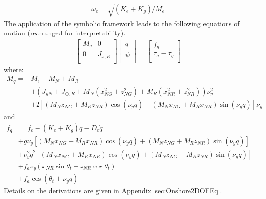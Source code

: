 \documentclass[wes, manuscript]{copernicus}
\begin{document}
\begin{align}
    \omega_e = \sqrt{(K_e+K_g)/M_e}
\end{align}
The application of the symbolic framework leads to the following equations of motion (rearranged for interpretability):
\begin{align}
    \begin{bmatrix}
    M_q & 0 \\ 
    0 & J_{x,R} \\ 
    \end{bmatrix}
    \begin{bmatrix}
    \ddot{q}\\
    \ddot{\psi}\\
    \end{bmatrix}
    =
    \begin{bmatrix}
    f_q \\
    \tau_a-\tau_g\\
    \end{bmatrix}
    \label{eq:EOM2DOF}
\end{align}
where:
\begin{align}
M_q = & M_{e} +  M_N + M_R \label{eq:Mq1}\\
     &+ (J_{y N} + J_{\oplus,R} + M_N(x_{NG}^{2} + z_{NG}^{2}) + M_R(x_{NR}^{2} + z_{NR}^{2}) ) \nu_y^{2}  \label{eq:Mq2}\\
     &+2  \left[   (M_N z_{NG} + M_R z_{NR}) \cos{\left(\nu_y q \right)} -(M_N x_{NG} + M_{R} x_{NR})\sin{\left(\nu_y q \right)} \right] \nu_y\label{eq:Mq3}
\end{align}
and
\begin{align}
 f_q &= f_{e} - (K_{e}+K_g) q  - D_{e} \dot{q} \label{eq:Fq1} \\
 &+ g \nu_y \left [ (M_N x_{NG}+M_R x_{NR}) \cos{\left(\nu_y q \right)}
 +                  (M_N z_{NG}+M_R z_{NR}) \sin{\left(\nu_y q \right)} \right]  \label{eq:Fq2}\\
 &+ \nu_y^2 \dot{q}^2\left[
  ( M_N x_{NG} + M_R x_{NR}) \cos{\left(\nu_y q \right)} 
 +( M_N z_{NG} + M_R z_{NR}) \sin{\left(\nu_y q \right)}
 \right]  \label{eq:Fq3} \\
 &+f_a \nu_y ( x_{NR} \sin\theta_t + z_{NR} \cos\theta_t)  \label{eq:Fq4} \\
 &+ f_a \cos{\left(\theta_t + \nu_y q \right)}\label{eq:Fq5} 
\end{align}
Details on the derivations are given in Appendix \ref{sec:Onshore2DOFEq}.
\end{document}
